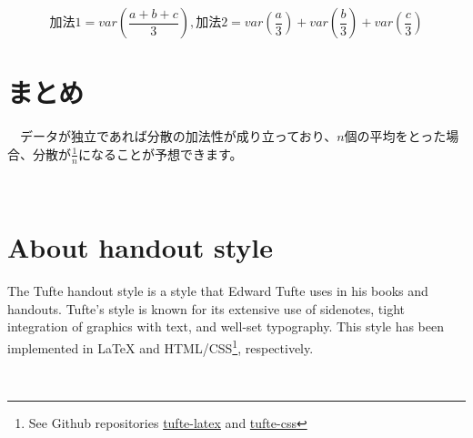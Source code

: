 \documentclass[a4paper]{tufte-handout}
\begin{document}
\begin{table}

\caption{\label{tab:unnamed-chunk-6}三つのサンプルのどれかが独立でない場合}
\centering
{}
\end{table}

\[\mbox{加法1} = var(\frac{a + b + c}{3}),　\mbox{加法2} = var(\frac{a}{3}) + var(\frac{b}{3}) + var(\frac{c}{3})\]

\newpage

\hypertarget{ux307eux3068ux3081}{%
\section{まとめ}\label{ux307eux3068ux3081}}

　データが独立であれば分散の加法性が成り立っており、\(n\)個の平均をとった場合、分散が\(\frac{1}{n}\)になることが予想できます。

　

\hypertarget{about-handout-style}{%
\section{About handout style}\label{about-handout-style}}

The Tufte handout style is a style that Edward Tufte uses in his books
and handouts. Tufte's style is known for its extensive use of sidenotes,
tight integration of graphics with text, and well-set typography. This
style has been implemented in LaTeX and HTML/CSS\footnote{See Github
  repositories
  \href{https://github.com/tufte-latex/tufte-latex}{tufte-latex} and
  \href{https://github.com/edwardtufte/tufte-css}{tufte-css}},
respectively.

　


\end{document}
